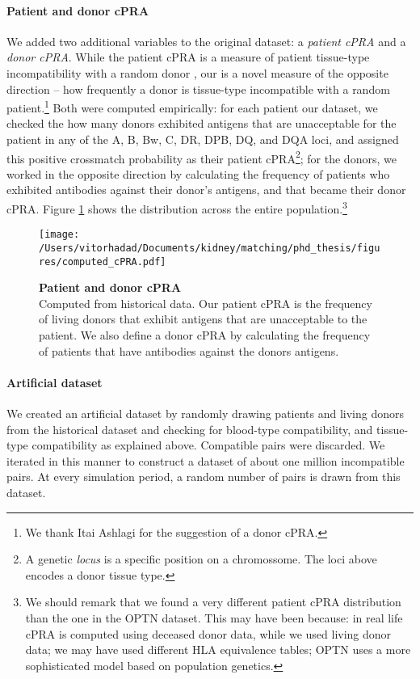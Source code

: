 \documentclass[format=acmsmall, review=false]{acmart}
\begin{document}
\paragraph{Patient and donor cPRA} We added two additional variables to the original dataset: a \emph{patient cPRA} and a \emph{donor cPRA}. While the patient cPRA is a measure of patient tissue-type incompatibility with a random donor \cite{cecka2010calculated}, our  is a novel measure of the opposite direction -- how frequently a donor is tissue-type incompatible with a random patient.\footnote{We thank Itai Ashlagi for the suggestion of a donor cPRA.} Both were computed empirically: for each patient our dataset, we checked the how many donors exhibited antigens that are unacceptable for the patient in any of the A, B, Bw, C, DR, DPB, DQ, and DQA loci, and assigned this positive crossmatch probability as their patient cPRA\footnote{A genetic \emph{locus} is a specific position on a chromossome. The loci above encodes a donor tissue type.}; for the donors, we worked in the opposite direction by calculating the frequency of patients who exhibited antibodies against their donor's antigens, and that became their donor cPRA. Figure \ref{fig:cpra} shows the distribution across the entire population.\footnote{We should remark that we found a very different patient cPRA distribution than the one in the OPTN dataset. This may have been because: in real life cPRA is computed using deceased donor data, while we used living donor data; we may have used different HLA equivalence tables; OPTN uses a more sophisticated model based on population genetics.\cite{optn2013cpra}}


\begin{figure}
\centering
\texttt{[image: /Users/vitorhadad/Documents/kidney/matching/phd\_thesis/figures/computed\_cPRA.pdf]}
\caption{\textbf{Patient and donor cPRA} \\
    Computed from historical data. Our patient cPRA is the frequency of living donors that exhibit antigens that are unacceptable to the patient. We also define a donor cPRA by calculating the frequency of patients that have antibodies against the donors antigens.}
\label{fig:cpra}
\end{figure}


\paragraph{Artificial dataset} We created an artificial dataset by randomly drawing patients and living donors from the historical dataset and checking for blood-type compatibility, and tissue-type compatibility as explained above. Compatible pairs were discarded. We iterated in this manner to construct a dataset of about one million incompatible pairs. At every simulation period, a random number of pairs is drawn from this dataset.
\end{document}
